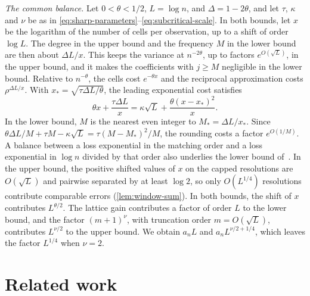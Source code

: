 \emph{The common balance.} Let $0<\theta<1/2$, $L=\log n$, and
$\Delta=1-2\theta$, and let $\tau$, $\kappa$ and $\nu$ be as in
\eqref{eq:sharp-parameters}--\eqref{eq:subcritical-scale}. In both bounds, let $x$ be the logarithm of the
number of cells per observation, up to a shift of order $\log L$. The
degree in the upper bound and the frequency $M$ in the lower bound are
then about $\Delta L/x$. This keeps the variance at $n^{-2\theta}$, up
to factors $e^{O(\sqrt L)}$, in the upper bound, and it makes the
coefficients with $j\ge M$ negligible in the lower bound. Relative to
$n^{-\theta}$, the cells cost $e^{-\theta x}$ and the reciprocal
approximation costs $\rho^{\Delta L/x}$. With
$x_*=\sqrt{\tau\Delta L/\theta}$, the leading exponential cost
satisfies
\[
 \theta x+\frac{\tau\Delta L}x
 =\kappa\sqrt L+\frac{\theta(x-x_*)^2}x .
\]
In the lower bound, $M$ is the nearest even integer to
$M_*=\Delta L/x_*$. Since
$\theta\Delta L/M+\tau M-\kappa\sqrt L=\tau(M-M_*)^2/M$, the
rounding costs a factor $e^{O(1/M)}$. A balance between a loss
exponential in the matching order and a loss exponential in $\log n$
divided by that order also underlies the lower bound
of~\cite{aronowlopatto}. In the upper bound, the positive shifted values of $x$ on the capped
resolutions are $O(\sqrt L)$ and pairwise separated by at least $\log2$,
so only $O(L^{1/4})$ resolutions contribute comparable errors
(\cref{lem:window-sum}). In both bounds, the shift of $x$
contributes $L^{\theta/2}$. The lattice gain contributes a factor of
order $L$ to the lower bound, and the factor $(m+1)^\nu$, with truncation order
$m=O(\sqrt L)$, contributes $L^{\nu/2}$ to the upper bound. We obtain
$a_nL$ and $a_nL^{\nu/2+1/4}$, which leaves the factor $L^{1/4}$ when
$\nu=2$.

\section{Related work}\label{sec:related}

